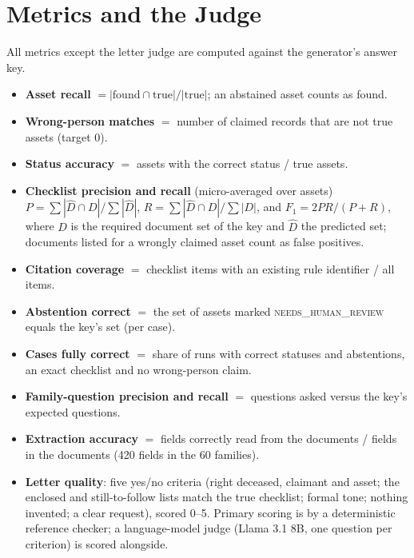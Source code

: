 \section{Metrics and the Judge}\label{sec:judge}
All metrics except the letter judge are computed against the generator's answer key.

\begin{itemize}[leftmargin=*,itemsep=2pt]
\item \textbf{Asset recall} $=|\text{found}\cap\text{true}|/|\text{true}|$; an abstained asset counts as found.
\item \textbf{Wrong-person matches} $=$ number of claimed records that are not true assets (target 0).
\item \textbf{Status accuracy} $=$ assets with the correct status / true assets.
\item \textbf{Checklist precision and recall} (micro-averaged over assets) $P=\sum|\hat D\cap D|/\sum|\hat D|$, $R=\sum|\hat D\cap D|/\sum|D|$, and $F_1=2PR/(P+R)$, where $D$ is the required document set of the key and $\hat D$ the predicted set; documents listed for a wrongly claimed asset count as false positives.
\item \textbf{Citation coverage} $=$ checklist items with an existing rule identifier / all items.
\item \textbf{Abstention correct} $=$ the set of assets marked \textsc{needs\_human\_review} equals the key's set (per case).
\item \textbf{Cases fully correct} $=$ share of runs with correct statuses and abstentions, an exact checklist and no wrong-person claim.
\item \textbf{Family-question precision and recall} $=$ questions asked versus the key's expected questions.
\item \textbf{Extraction accuracy} $=$ fields correctly read from the documents / fields in the documents (420 fields in the 60 families).
\item \textbf{Letter quality}: five yes/no criteria (right deceased, claimant and asset; the enclosed and still-to-follow lists match the true checklist; formal tone; nothing invented; a clear request), scored 0--5. Primary scoring is by a deterministic reference checker; a language-model judge (Llama 3.1 8B, one question per criterion) is scored alongside.
\end{itemize}

